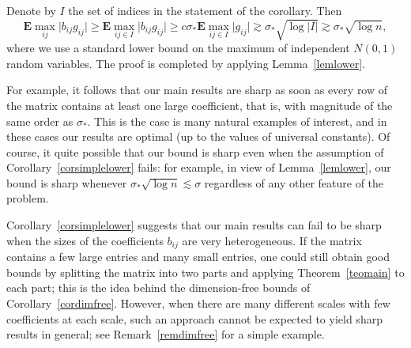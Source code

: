 \documentclass[aop,MSNbibl,dvips]{arximspdf}
\newcommand{\rrvert}{\vert}
\newcommand{\llvert}{\vert}
\newcommand{\EE}{\mathbf{E}}
\begin{document}
\begin{pf}
Denote by $I$ the set of indices in the statement of the corollary.
Then
%
\[
\EE\max_{ij}\llvert b_{ij}g_{ij}\rrvert
\ge\EE\max_{ij\in I}\llvert b_{ij}g_{ij}
\rrvert\ge c\sigma_*\EE\max_{ij\in I}\llvert g_{ij}
\rrvert\gtrsim\sigma_*\sqrt{\log\llvert I\rrvert} \gtrsim\sigma
_*\sqrt{\log n},
%
\]
%
where we use a standard lower bound on the maximum of independent
$N(0,1)$ random variables. The proof is completed by applying
Lemma~\ref{lemlower}.
\end{pf}

For example, it follows that our main results are sharp as soon as every
row of the matrix contains at least one large coefficient, that is, with
magnitude of the same order as $\sigma_*$. This is the case is many
natural examples of interest, and in these cases our results are optimal
(up to the values of universal constants).
Of course, it quite possible that our bound is sharp even when the
assumption of Corollary~\ref{corsimplelower} fails: for example, in view
of Lemma~\ref{lemlower}, our bound is sharp whenever $\sigma_*\sqrt
{\log
n}\lesssim\sigma$ regardless of any other feature of the problem.

Corollary~\ref{corsimplelower} suggests that our main results can
fail to
be sharp when the sizes of the coefficients $b_{ij}$ are very
heterogeneous. If the matrix contains a few large entries and many small
entries, one could still obtain good bounds by splitting the matrix into
two parts and applying Theorem~\ref{teomain} to each part; this is the
idea behind the dimension-free bounds of Corollary~\ref{cordimfree}.
However, when there are many different scales with few coefficients at
each scale, such an approach cannot be expected to yield sharp results in
general; see Remark~\ref{remdimfree} for a simple example.
\end{document}
